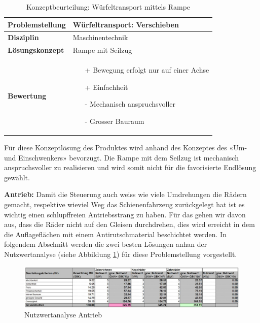 \documentclass[../../main.tex]{subfiles}
\begin{document}
\begin{flushleft}
    \begin{table}[h]
    \begin{tabular}{ | l | p{11cm} |}
    \hline
    \textbf{Problemstellung} & Würfeltransport: Verschieben \\ \hline
    \textbf{Disziplin} & Maschinentechnik \\ \hline
    \textbf{Lösungskonzept} &  Rampe mit Seilzug \\ \hline
    \textbf{Bewertung} &  \begin{itemize}
                            \item[+] Bewegung erfolgt nur auf einer Achse
                            \item[+] Einfachheit
                            \item[-] Mechanisch anspruchsvoller
                            \item[-] Grosser Bauraum
                          \end{itemize} \\ \hline
    \end{tabular}
    \caption{Konzeptbeurteilung: Würfeltransport mittels Rampe}
    \label{tab:konzept_wurfeltrransport_umschwenker}
\end{table}
\end{flushleft}
Für diese Konzeptlösung des Produktes wird anhand des Konzeptes des «Um- und Einschwenkers» bevorzugt. Die Rampe mit dem Seilzug ist mechanisch anspruchsvoller zu realisieren und wird somit nicht für die favorisierte Endlösung gewählt.

\textbf{Antrieb:}
Damit die Steuerung auch weiss wie viele Umdrehungen die Rädern gemacht, respektive wieviel Weg das Schienenfahrzeug zurückgelegt hat ist es wichtig einen schlupffreien Antriebsstrang zu haben. Für das gehen wir davon aus, dass die Räder nicht auf den Gleisen durchdrehen, dies wird erreicht in dem die Auflageflächen mit einem Antirutschmaterial beschichtet werden. In folgendem Abschnitt werden die zwei besten Lösungen anhan der Nutzwertanalyse (siehe Abbildung \ref{fig:antrieb}) für diese Problemstellung vorgestellt.

\begin{figure}[H] %
    \centering
    \includegraphics[width=1\textwidth]{Antriebsstrang}
    \caption{Nutzwertanalyse Antrieb}
    \label{fig:antrieb}
\end{figure}
\end{document}
